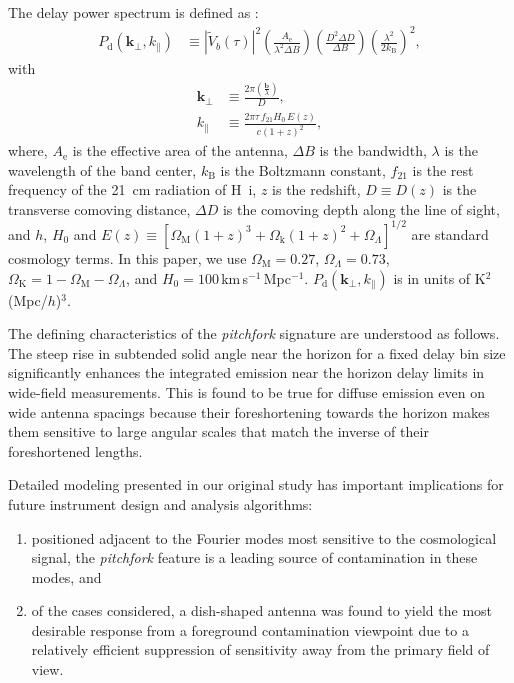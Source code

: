 \documentclass[preprint2,apjl,numberedappendix,twocolappendix,appendixfloats]{emulateapj}
\begin{document}
The delay power spectrum is defined as \citep{par12a,thy15}:
\begin{align}\label{eqn:delay-power-spectrum}
  P_\textrm{d}(\boldsymbol{k}_\perp,k_\parallel) &\equiv |\tilde{V}_b(\tau)|^2\left(\frac{A_\textrm{e}}{\lambda^2\Delta B}\right)\left(\frac{D^2\Delta D}{\Delta B}\right)\left(\frac{\lambda^2}{2k_\textrm{B}}\right)^2,
\end{align}
with
\begin{align}
  \boldsymbol{k}_\perp &\equiv \frac{2\pi(\frac{\boldsymbol{b}}{\lambda})}{D}, \\
  k_\parallel &\equiv \frac{2\pi\tau\,f_{21}H_0\,E(z)}{c(1+z)^2}, 
\end{align}
where, $A_\textrm{e}$ is the effective area of the antenna, $\Delta B$ is the bandwidth, $\lambda$ is the wavelength of the band center, $k_\textrm{B}$ is the Boltzmann constant, $f_{21}$ is the rest frequency of the 21~cm radiation of H~{\sc i}, $z$ is the redshift, $D\equiv D(z)$ is the transverse comoving distance, $\Delta D$ is the comoving depth along the line of sight, and $h$, $H_0$ and $E(z)\equiv [\Omega_\textrm{M}(1+z)^3+\Omega_\textrm{k}(1+z)^2+\Omega_\Lambda]^{1/2}$ are standard cosmology terms. In this paper, we use $\Omega_\textrm{M}=0.27$, $\Omega_\Lambda=0.73$, $\Omega_\textrm{K}=1-\Omega_\textrm{M}-\Omega_\Lambda$, and $H_0=100\,$km$\,$s$^{-1}\,$Mpc$^{-1}$. $P_\textrm{d}(\boldsymbol{k}_\perp,k_\parallel)$ is in units of K$^2$(Mpc/$h$)$^3$.

The defining characteristics of the {\it pitchfork} signature are understood as follows. The steep rise in subtended solid angle near the horizon for a fixed delay bin size significantly enhances the integrated emission near the horizon delay limits in wide-field measurements. This is found to be true for diffuse emission even on wide antenna spacings because their foreshortening towards the horizon makes them sensitive to large angular scales that match the inverse of their foreshortened lengths. 

Detailed modeling presented in our original study \citep{thy15} has important implications for future instrument design and analysis algorithms:
\begin{enumerate}
\item positioned adjacent to the Fourier modes most sensitive to the cosmological signal, the {\it pitchfork} feature is a leading source of contamination in these modes, and 
\item of the cases considered, a dish-shaped antenna was found to yield the most desirable response from a foreground contamination viewpoint due to a relatively efficient suppression of sensitivity away from the primary field of view. 
\end{enumerate}
\end{document}
